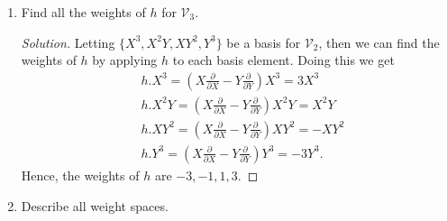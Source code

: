 \documentclass[12pt]{article}
\theoremstyle{definition}
\theoremstyle{definition}
\newenvironment{solution}
  {\renewcommand\qedsymbol{$\blacksquare$}\begin{proof}[Solution]}
  {\end{proof}}
\begin{document}
\begin{enumerate}
\begin{enumerate}
\begin{solution}
\begin{equation*}
\begin{split}
{                                X}-Y\frac{\partial}{\partial Y})u \\
                                &=\alpha(x.u)+\beta(y.u)+\gamma(h.u) \\
                                &=(\alpha_1+\alpha_2)(x.u)+(\beta_1+\beta_2)(y.u)+(\gamma_1+\gamma_2)(h.u)
                                \\
                                &= \alpha_1(x.u)+\beta_1(y.u)+\gamma_1(h.u) \\
                                &\quad\quad
                                +\alpha_2(x.u)+\beta_2(y.u)+\gamma_2(h.u),
                            \end{split}
                        \end{equation*}
                        which proves M1. REMINDER: Finish showing M2 and M3.
                    \end{solution}
                \item Find all the weights of $h$ for $\mathcal{V}_3$.
                    \begin{solution}
                        Letting $\{X^3, X^2Y, XY^2, Y^3\}$ be a basis for
                        $\mathcal{V}_2$, then we can find the weights of $h$ by
                        applying $h$ to each basis element. Doing this we get
                        \begin{equation*}
                            \begin{split}
                                &h.X^3=(X\frac{\partial}{\partial
                                X}-Y\frac{\partial}{\partial Y})X^3=3X^3 \\
                                &h.X^2Y=(X\frac{\partial}{\partial
                                X}-Y\frac{\partial}{\partial Y})X^2Y=X^2Y \\
                                &h.XY^2=(X\frac{\partial}{\partial
                                X}-Y\frac{\partial}{\partial Y})XY^2=-XY^2 \\
                                &h.Y^3=(X\frac{\partial}{\partial
                                X}-Y\frac{\partial}{\partial Y})Y^3=-3Y^3.
                            \end{split}
                        \end{equation*}
                        Hence, the weights of $h$ are $-3, -1, 1, 3$.
                    \end{solution}
                \item Describe all weight spaces.

\end{enumerate}
\end{enumerate}
\end{document}
